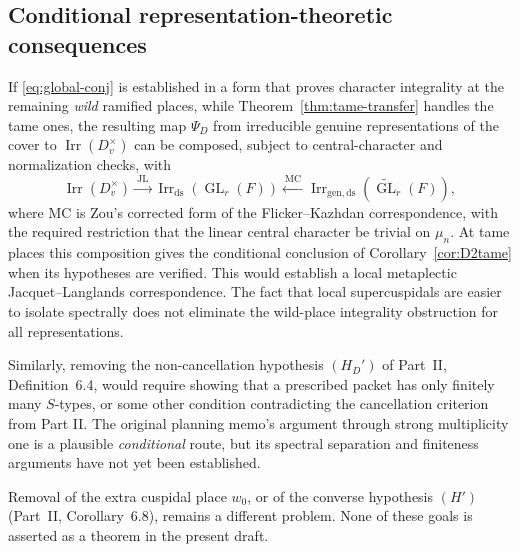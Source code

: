 \documentclass[11pt]{article}
\newcommand{\GL}{\operatorname{GL}}
\newcommand{\Irr}{\operatorname{Irr}}
\newcommand{\JL}{\mathrm{JL}}
\theoremstyle{plain}
\theoremstyle{definition}
\begin{document}
\subsection{Conditional representation-theoretic consequences}
If \eqref{eq:global-conj} is established in a form that proves character integrality at the remaining \emph{wild} ramified places, while Theorem~\ref{thm:tame-transfer} handles the tame ones, the resulting map $\Psi_D$ from irreducible genuine representations of the cover to $\Irr(D_v^\times)$ can be composed, subject to central-character and normalization checks, with
\[
\Irr(D_v^\times)\xrightarrow{\ \JL\ }
\Irr_{\mathrm{ds}}(\GL_r(F))
\xleftarrow{\ \mathrm{MC}\ }
\Irr_{\mathrm{gen,ds}}(\widetilde{\GL}_r(F)),
\]
where $\mathrm{MC}$ is Zou's corrected form of the Flicker--Kazhdan correspondence, with the required restriction that the linear central character be trivial on $\mu_n$. At tame places this composition gives the conditional conclusion of Corollary~\ref{cor:D2tame} when its hypotheses are verified.
This would establish a local metaplectic Jacquet--Langlands correspondence. The fact that local supercuspidals are easier to isolate spectrally does not eliminate the wild-place integrality obstruction for all representations.

Similarly, removing the non-cancellation hypothesis $(H_D')$ of Part~II, Definition~6.4, would require showing that a prescribed packet has only finitely many $S$-types, or some other condition contradicting the cancellation criterion from Part II. The original planning memo's argument through strong multiplicity one is a plausible \emph{conditional} route, but its spectral separation and finiteness arguments have not yet been established.

Removal of the extra cuspidal place $w_0$, or of the converse hypothesis $(H')$ (Part~II, Corollary~6.8), remains a different problem. None of these goals is asserted as a theorem in the present draft.
\end{document}
